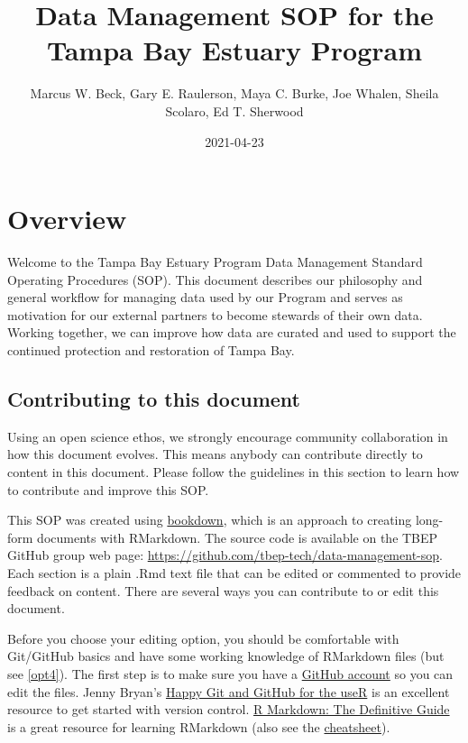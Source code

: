 \documentclass[
]{book}
\title{Data Management SOP for the Tampa Bay Estuary Program}
\author{Marcus W. Beck, Gary E. Raulerson, Maya C. Burke, Joe Whalen, Sheila Scolaro, Ed T. Sherwood}
\date{2021-04-23}
\begin{document}
\maketitle

{
\setcounter{tocdepth}{1}
\tableofcontents
}
\hypertarget{overview}{%
\chapter{Overview}\label{overview}}

Welcome to the Tampa Bay Estuary Program Data Management Standard Operating Procedures (SOP). This document describes our philosophy and general workflow for managing data used by our Program and serves as motivation for our external partners to become stewards of their own data. Working together, we can improve how data are curated and used to support the continued protection and restoration of Tampa Bay.

\hypertarget{contrib}{%
\section{Contributing to this document}\label{contrib}}

Using an open science ethos, we strongly encourage community collaboration in how this document evolves. This means anybody can contribute directly to content in this document. Please follow the guidelines in this section to learn how to contribute and improve this SOP.

This SOP was created using \href{https://bookdown.org/}{bookdown}, which is an approach to creating long-form documents with RMarkdown. The source code is available on the TBEP GitHub group web page: \url{https://github.com/tbep-tech/data-management-sop}. Each section is a plain .Rmd text file that can be edited or commented to provide feedback on content. There are several ways you can contribute to or edit this document.

Before you choose your editing option, you should be comfortable with Git/GitHub basics and have some working knowledge of RMarkdown files (but see \ref{opt4}). The first step is to make sure you have a \href{https://github.com/join}{GitHub account} so you can edit the files. Jenny Bryan's \href{https://happygitwithr.com/}{Happy Git and GitHub for the useR} is an excellent resource to get started with version control. \href{https://bookdown.org/yihui/rmarkdown/}{R Markdown: The Definitive Guide} is a great resource for learning RMarkdown (also see the \href{https://rstudio.com/wp-content/uploads/2015/03/rmarkdown-reference.pdf}{cheatsheet}).
\end{document}
